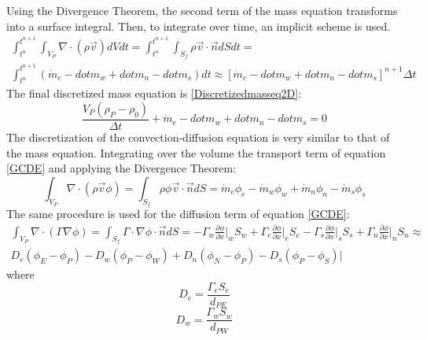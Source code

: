 Using the Divergence Theorem, the second term of the mass equation transforms into a surface integral. Then, to integrate over time, an implicit scheme is used.
\begin{equation}
\begin{aligned}
\int_{t^{n}}^{t^{n+1}}\int_{V_{P}}^{}\nabla\cdot\left(\rho\vec{v}\right)dVdt=\int_{t^{n}}^{t^{n+1}}\int_{S_{f}}^{}\rho\vec{v}\cdot\vec{n}dSdt= \\
\int_{t^{n}}^{t^{n+1}}\left(\dot{m}_{e}-dot{m}_{w}+dot{m}_{n}-dot{m}_{s}\right)dt\approx\left[\dot{m}_{e}-dot{m}_{w}+dot{m}_{n}-dot{m}_{s}\right]^{n+1}\Delta t
\end{aligned}
\end{equation}
The final discretized mass equation is \ref{Discretizedmasseq2D}:
\begin{equation}
\frac{V_{P}\left(\rho_{P}-\rho_{0}\right)}{\Delta t}+\dot{m}_{e}-dot{m}_{w}+dot{m}_{n}-dot{m}_{s}=0
\label{Discretizedmasseq2D}
\end{equation}
The discretization of the convection-diffusion equation is very similar to that of the mass equation. Integrating over the volume the transport term of equation \ref{GCDE} and applying the Divergence Theorem:
\begin{equation}
\int_{V_{P}}\nabla\cdot\left(\rho\vec{v}\phi\right)=\int_{S_{f}}\rho\phi\vec{v}\cdot\vec{n}dS=\dot{m}_{e}\phi_{e}-\dot{m}_{w}\phi_{w}+\dot{m}_{n}\phi_{n}-\dot{m}_{s}\phi_{s}
\end{equation}
The same procedure is used for the diffusion term of equation \ref{GCDE}:
\begin{equation}
\begin{aligned}
\int_{V_{P}}\nabla\cdot\left(\Gamma\nabla\phi\right)=\int_{S_{f}}\Gamma\cdot\nabla\phi\cdot\vec{n}dS=-\Gamma_{w}\frac{\partial\phi}{\partial x}\big|_{w}S_{w}+\Gamma_{e}\frac{\partial\phi}{\partial x}\big|_{e}S_{e}-\Gamma_{s}\frac{\partial\phi}{\partial x}\big|_{s}S_{s}+\Gamma_{n}\frac{\partial\phi}{\partial x}\big|_{n}S_{n}\approx \\
D_{e}\left(\phi_{E}-\phi_{P}\right)-D_{w}\left(\phi_{P}-\phi_{W}\right)+D_{n}\left(\phi_{N}-\phi_{P}\right)-D_{s}\left(\phi_{P}-\phi_{S}\right)\big|
\end{aligned}
\end{equation}
where
\begin{equation}
D_{e}=\frac{\Gamma_{e}S_{e}}{d_{PE}}
\end{equation}
\begin{equation}
D_{w}=\frac{\Gamma_{w}S_{w}}{d_{PW}}
\end{equation}
